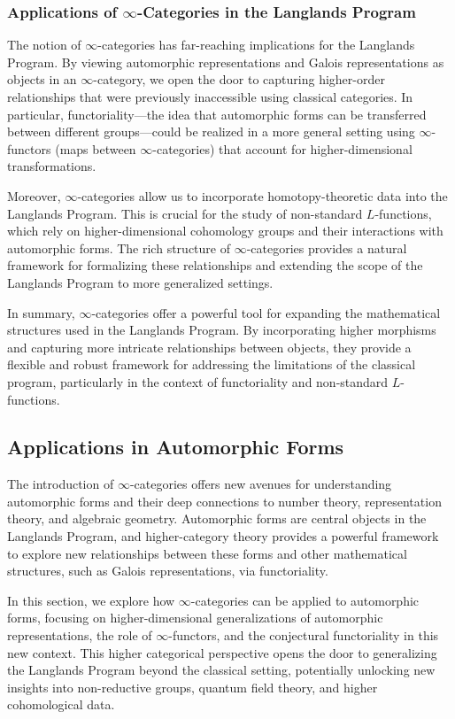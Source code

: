 \documentclass{article}
\theoremstyle{remark}
\begin{document}
\subsubsection{Applications of $\infty$-Categories in the Langlands Program}

The notion of $\infty$-categories has far-reaching implications for the Langlands Program. By viewing automorphic representations and Galois representations as objects in an $\infty$-category, we open the door to capturing higher-order relationships that were previously inaccessible using classical categories. In particular, functoriality—the idea that automorphic forms can be transferred between different groups—could be realized in a more general setting using $\infty$-functors (maps between $\infty$-categories) that account for higher-dimensional transformations.

Moreover, $\infty$-categories allow us to incorporate homotopy-theoretic data into the Langlands Program. This is crucial for the study of non-standard $L$-functions, which rely on higher-dimensional cohomology groups and their interactions with automorphic forms. The rich structure of $\infty$-categories provides a natural framework for formalizing these relationships and extending the scope of the Langlands Program to more generalized settings.

In summary, $\infty$-categories offer a powerful tool for expanding the mathematical structures used in the Langlands Program. By incorporating higher morphisms and capturing more intricate relationships between objects, they provide a flexible and robust framework for addressing the limitations of the classical program, particularly in the context of functoriality and non-standard $L$-functions.

\subsection{Applications in Automorphic Forms}

The introduction of $\infty$-categories offers new avenues for understanding automorphic forms and their deep connections to number theory, representation theory, and algebraic geometry. Automorphic forms are central objects in the Langlands Program, and higher-category theory provides a powerful framework to explore new relationships between these forms and other mathematical structures, such as Galois representations, via functoriality.

In this section, we explore how $\infty$-categories can be applied to automorphic forms, focusing on higher-dimensional generalizations of automorphic representations, the role of $\infty$-functors, and the conjectural functoriality in this new context. This higher categorical perspective opens the door to generalizing the Langlands Program beyond the classical setting, potentially unlocking new insights into non-reductive groups, quantum field theory, and higher cohomological data.
\end{document}
